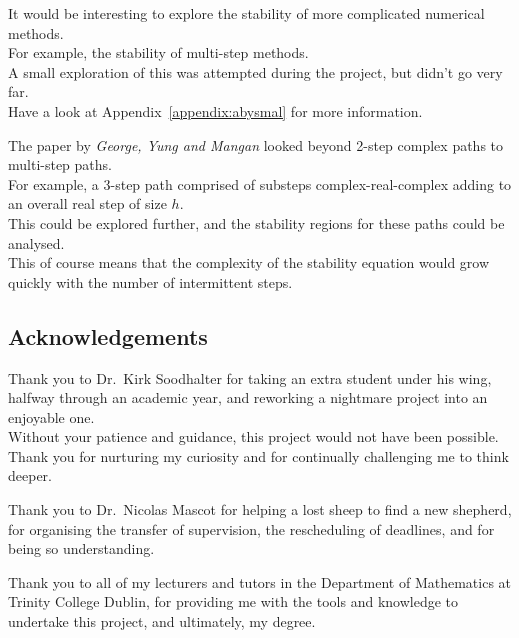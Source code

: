 \par It would be interesting to explore the stability of more complicated numerical methods.\\
For example, the stability of multi-step methods.\\
A small exploration of this was attempted during the project, but didn't go very far.\\
Have a look at Appendix~\ref{appendix:abysmal} for more information.\\

\par The paper by \textit{George, Yung and Mangan}\cite{walking_into_the_complex_domain} looked beyond 2-step complex paths to multi-step paths.\\
For example, a 3-step path comprised of substeps complex-real-complex adding to an overall real step of size $h$.\\
This could be explored further, and the stability regions for these paths could be analysed.\\
This of course means that the complexity of the stability equation would grow quickly with the number of intermittent steps.\\


\subsection{Acknowledgements}
\par Thank you to Dr.~Kirk Soodhalter for taking an extra student under his wing, halfway through an academic year, and reworking a nightmare project into an enjoyable one.\\
Without your patience and guidance, this project would not have been possible.\\
Thank you for nurturing my curiosity and for continually challenging me to think deeper.\\

\par Thank you to Dr.~Nicolas Mascot for helping a lost sheep to find a new shepherd, for organising the transfer of supervision, the rescheduling of deadlines, and for being so understanding.\\

\par Thank you to all of my lecturers and tutors in the Department of Mathematics at Trinity College Dublin, for providing me with the tools and knowledge to undertake this project, and ultimately, my degree.\\

